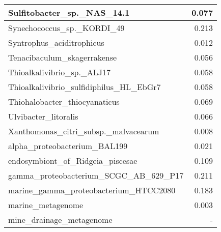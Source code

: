 \documentclass[12pt,a4paper]{article}
\begin{document}
\begin{table}[ht]
\begin{center}
\begin{tabular}{|l*{1}{|r}|}
Sulfitobacter\_sp.\_NAS\_14.1 & 0.077 \\ \hline
Synechococcus\_sp.\_KORDI\_49 & 0.213 \\ \hline
Syntrophus\_aciditrophicus & 0.012 \\ \hline
Tenacibaculum\_skagerrakense & 0.056 \\ \hline
Thioalkalivibrio\_sp.\_ALJ17 & 0.058 \\ \hline
Thioalkalivibrio\_sulfidiphilus\_HL\_EbGr7 & 0.058 \\ \hline
Thiohalobacter\_thiocyanaticus & 0.069 \\ \hline
Ulvibacter\_litoralis & 0.066 \\ \hline
Xanthomonas\_citri\_subsp.\_malvacearum & 0.008 \\ \hline
alpha\_proteobacterium\_BAL199 & 0.021 \\ \hline
endosymbiont\_of\_Ridgeia\_piscesae & 0.109 \\ \hline
gamma\_proteobacterium\_SCGC\_AB\_629\_P17 & 0.211 \\ \hline
marine\_gamma\_proteobacterium\_HTCC2080 & 0.183 \\ \hline
marine\_metagenome & 0.003 \\ \hline
mine\_drainage\_metagenome & - \\ \hline
\end{tabular}
\end{center}
\end{table}
\end{document}
